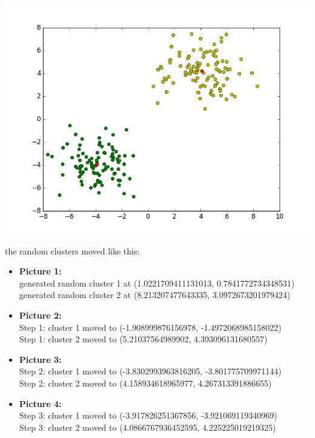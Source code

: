 \documentclass[12pt]{article}
\begin{document}
\begin{enumerate}[a)]
\begin{center}
            \includegraphics[scale = 0.52]{pictures/plot4}\\
        \end{center}

        the random clusters moved like this:
        \begin{itemize}

            \item 
                \textbf{Picture 1:}\\
                generated random cluster 1 at (1.0221709411131013, 0.7841772734348531)\\
                generated random cluster 2 at (8.213207477643335, 3.0972673201979424)

            \item 
                \textbf{Picture 2:}\\
                Step 1: cluster 1 moved to (-1.908999876156978, -1.4972068985158022)\\
                Step 1: cluster 2 moved to (5.21037564989902, 4.393096131680557)

            \item 
                \textbf{Picture 3:}\\
                Step 2: cluster 1 moved to (-3.8302993963816205, -3.801775709971144)\\
                Step 2: cluster 2 moved to (4.158934618965977, 4.267313391886655)

            \item 
                \textbf{Picture 4:}\\
                Step 3: cluster 1 moved to (-3.917826251367856, -3.921069119340969)\\
                Step 3: cluster 2 moved to (4.0866767936452595, 4.225225019219325)


\end{itemize}
\end{enumerate}
\end{document}
